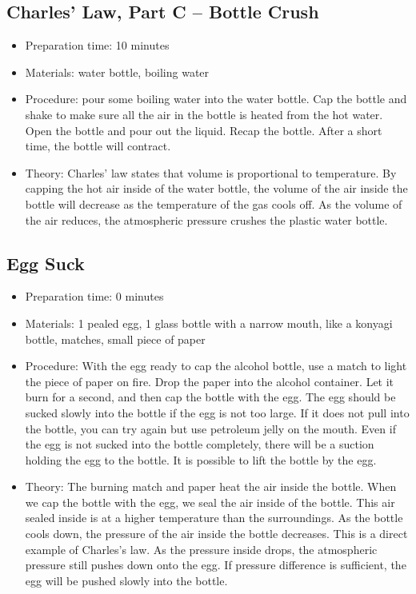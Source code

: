 \subsection{Charles’ Law, Part C – Bottle Crush}
\begin{itemize}
\item{Preparation time: 10 minutes}
\item{Materials: water bottle, boiling water}
\item{Procedure: pour some boiling water into the water bottle. Cap the bottle and shake to make sure all the air in the bottle is heated from the hot water. Open the bottle and pour out the liquid. Recap the bottle. After a short time, the bottle will contract.}
\item{Theory: Charles’ law states that volume is proportional to temperature. By capping the hot air inside of the water bottle, the volume of the air inside the bottle will decrease as the temperature of the gas cools off. As the volume of the air reduces, the atmospheric pressure crushes the plastic water bottle.}
\end{itemize}

\subsection{Egg Suck}
\begin{itemize}
\item{Preparation time: 0 minutes}
\item{Materials: 1 pealed egg, 1 glass bottle with a narrow mouth, like a konyagi bottle, matches, small piece of paper}
\item{Procedure: With the egg ready to cap the alcohol bottle, use a match to light the piece of paper on fire. Drop the paper into the alcohol container. Let it burn for a second, and then cap the bottle with the egg. The egg should be sucked slowly into the bottle if the egg is not too large. If it does not pull into the bottle, you can try again but use petroleum jelly on the mouth. Even if the egg is not sucked into the bottle completely, there will be a suction holding the egg to the bottle. It is possible to lift the bottle by the egg.}
\item{Theory: The burning match and paper heat the air inside the bottle. When we cap the bottle with the egg, we seal the air inside of the bottle. This air sealed inside is at a higher temperature than the surroundings. As the bottle cools down, the pressure of the air inside the bottle decreases. This is a direct example of Charles’s law. As the pressure inside drops, the atmospheric pressure still pushes down onto the egg. If pressure difference is sufficient, the egg will be pushed slowly into the bottle. }
\end{itemize}

